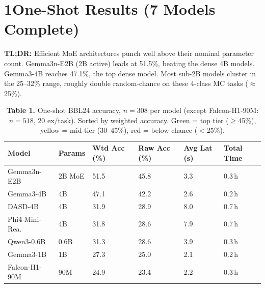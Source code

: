\documentclass[11pt,letterpaper]{article}
\begin{document}
\newpage

\section*{1\quad One-Shot Results (7 Models Complete)}

\noindent\textbf{TL;DR:} Efficient MoE architectures punch well above their nominal parameter
count. Gemma3n-E2B (2B active) leads at 51.5\%, beating the dense 4B models. Gemma3-4B reaches
47.1\%, the top dense model. Most sub-2B models cluster in the 25--32\% range, roughly double
random-chance on these 4-class MC tasks ($\approx$25\%).

\vspace{0.2cm}

\begin{table}[h!]
\centering
\caption*{\textbf{Table 1.} One-shot BBL24 accuracy, $n=308$ per model (except Falcon-H1-90M: $n=518$, 20 ex/task).
  Sorted by weighted accuracy. Green = top tier ($\geq$45\%), yellow = mid-tier (30--45\%), red = below chance ($<$25\%).}
\begin{tabular}{l C{0.8cm} R{1.5cm} R{1.5cm} R{1.5cm} R{2.0cm}}
\toprule
\textbf{Model} & \textbf{Params} & \textbf{Wtd Acc (\%)} & \textbf{Raw Acc (\%)} & \textbf{Avg Lat (s)} & \textbf{Total Time} \\
\midrule
{} Gemma3n-E2B     & 2B MoE & 51.5 & 45.8 & 3.3  & 0.3\,h \\
 Gemma3-4B       & 4B     & 47.1 & 42.2 & 2.6  & 0.2\,h \\
 DASD-4B         & 4B     & 31.9 & 28.9 & 8.0  & 0.7\,h \\
 Phi4-Mini-Rea.  & 4B     & 31.8 & 28.6 & 7.9  & 0.7\,h \\
 Qwen3-0.6B      & 0.6B   & 31.3 & 28.6 & 3.9  & 0.3\,h \\
 Gemma3-1B       & 1B     & 27.3 & 25.0 & 2.1  & 0.2\,h \\
 Falcon-H1-90M   & 90M    & 24.9 & 23.4 & 2.2  & 0.3\,h \\
\bottomrule
\end{tabular}
\end{table}
\end{document}
